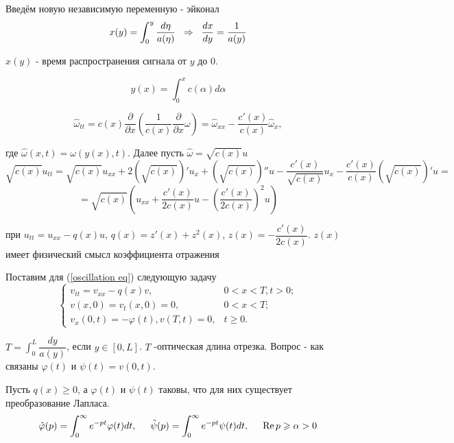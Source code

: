\documentclass{article}
\begin{document}
Введём новую независимую переменную - эйконал
\begin{equation*}
 x(y) = \int_0^y \dfrac{d \eta}{a(\eta)} 
 \hspace{0.2cm} \Rightarrow \hspace{0.2cm}
 \dfrac{dx}{dy} = \dfrac{1}{a(y)}
\end{equation*}

$x(y)$ - время распространения сигнала от $y$ до 0.

\begin{equation*}
y(x) = \int_0^x c(\alpha)d\alpha
\end{equation*}


\begin{equation}
\hat{\omega}_{tt} = c(x) \dfrac{\partial}{\partial x} \left(\dfrac{1}{c(x)} \dfrac{\partial}{\partial x} \omega \right) = \hat{\omega}_{xx} - \dfrac{c'(x)}{c(x)} \hat{\omega}_x,
\end{equation}

где $\hat{\omega}(x,t) = \omega(y(x),t)$. Далее пусть $\hat{\omega} = \sqrt{c(x)} u$
\begin{equation*}
\sqrt{c(x)}u_{tt} = \sqrt{c(x)}u_{xx} + 2 (\sqrt{c(x)})'u_{x} + (\sqrt{c(x)})''u - \dfrac{c'(x)}{\sqrt{c(x)}} u_x - \dfrac{c'(x)}{c(x)}(\sqrt{c(x)})' u =
\end{equation*}
\begin{equation*}
= \sqrt{c(x)} \left(u_{xx} + \dfrac{c'(x)}{2c(x)} u - (\dfrac{c'(x)}{2c(x)})^2 u \right)
\end{equation*}

при $u_{tt} = u_{xx} - q(x)u$, $q(x) = z'(x) + z^2(x)$, $z(x) = -\dfrac{c'(x)}{2c(x)}$. $z(x)$ имеет физический смысл коэффициента отражения

Поставим для (\ref{oscillation eq}) следующую задачу
\begin{equation}
\begin{cases}
	v_{tt} = v_{xx} - q(x) v, & 0<x<T, t > 0;\\
	v(x,0) = v_t(x,0) = 0, & 0<x<T;\\
	v_x(0,t) = -\varphi(t), v(T,t) = 0, & t\geqslant 0.
\end{cases}
\label{v task}
\end{equation}

$T = \int_0^L \dfrac{dy}{a(y)}$, если $y\in[0,L]$. $T$ -оптическая длина отрезка. Вопрос - как связаны $\varphi(t)$ и $\psi(t) = v(0,t)$.

Пусть $q(x) \geqslant 0$, а $\varphi(t)$ и $\psi(t)$ таковы, что для них существует преобразование Лапласа.
\begin{equation*}
\tilde{\varphi}(p) = \int_0^{\infty} e^{-pt} \varphi(t) d t,
\hspace{0.5cm}
\tilde{\psi}(p) = \int_0^{\infty} e^{-pt} \psi(t) d t,
\hspace{0.5cm} 
\operatorname{Re} p \geqslant \alpha > 0
\end{equation*}
\end{document}
